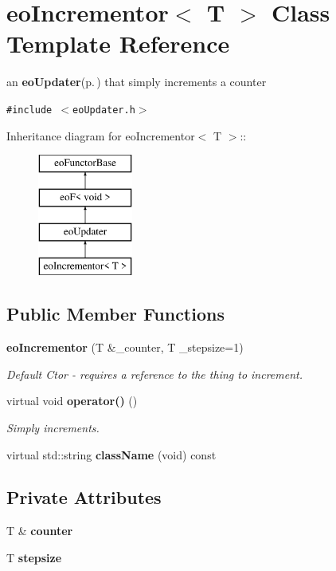 \section{eo\-Incrementor$<$ T $>$ Class Template Reference}
\label{classeo_incrementor}
an {\bf eo\-Updater}{\rm (p.\,\pageref{classeo_updater})} that simply increments a counter  


{\tt \#include $<$eo\-Updater.h$>$}

Inheritance diagram for eo\-Incrementor$<$ T $>$::\begin{figure}[H]
\begin{center}
\leavevmode
\includegraphics[height=4cm]{classeo_incrementor}
\end{center}
\end{figure}
\subsection*{Public Member Functions}
\begin{CompactItemize}
\item 
{\bf eo\-Incrementor} (T \&\_\-counter, T \_\-stepsize=1)\label{classeo_incrementor_a0}

\begin{CompactList}\small\item\em Default Ctor - requires a reference to the thing to increment. \item\end{CompactList}\item 
virtual void {\bf operator()} ()\label{classeo_incrementor_a1}

\begin{CompactList}\small\item\em Simply increments. \item\end{CompactList}\item 
virtual std::string {\bf class\-Name} (void) const \label{classeo_incrementor_a2}

\end{CompactItemize}
\subsection*{Private Attributes}
\begin{CompactItemize}
\item 
T \& {\bf counter}\label{classeo_incrementor_r0}

\item 
T {\bf stepsize}\label{classeo_incrementor_r1}

\end{CompactItemize}


